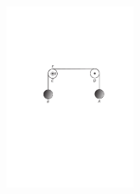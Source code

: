     \begin{figure}
    \vspace{-3mm}
    \includegraphics[trim = 0mm 0mm -1mm 0mm, clip, width=0.38\textwidth]{images/lh03705_009r-d1.pdf}\\
\noindent {}%
    \end{figure}
